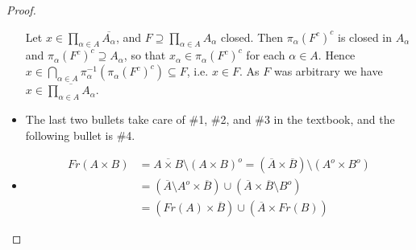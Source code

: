 \documentclass[12pt]{extarticle}
\newcommand{\<}{\langle}
\renewcommand{\>}{\rangle}
\theoremstyle{definition}
\begin{document}
\begin{proof}
\begin{itemize}
    Let $x \in \prod\limits_{\alpha \in A} \overline{A_{\alpha}}$, and $F \supseteq \prod\limits_{\alpha \in A} A_{\alpha}$ closed. Then $\pi_{\alpha}(F^c)^c$ is closed in $A_{\alpha}$ and $\pi_{\alpha}(F^c)^c \supseteq A_{\alpha}$,
    so that $x_\alpha \in \pi_{\alpha}(F^c)^c$ for each $\alpha \in A$. Hence $x \in \bigcap\limits_{\alpha \in A} \pi_{\alpha}^{-1}(\pi_{\alpha}(F^c)^c) \subseteq F$, i.e. $x \in F$.
    As $F$ was arbitrary we have $x \in \overline{\prod\limits_{\alpha \in A} A_{\alpha}}$.

  \item
    The last two bullets take care of \#1, \#2, and \#3 in the textbook, and the following bullet is \#4.
  \item
    \begin{align*}
      Fr(A \times B)
      &= \overline{A \times B} \setminus (A \times B)^o = (\overline{A} \times \overline{B}) \setminus (A^o \times B^o) \\
      &= (\overline{A} \setminus A^o \times \overline{B}) \cup (\overline{A} \times \overline{B} \setminus B^o) \\
      &= (Fr(A) \times \overline{B}) \cup (\overline{A} \times Fr(B))
    \end{align*}
  \end{itemize}
\end{proof}
\end{document}
